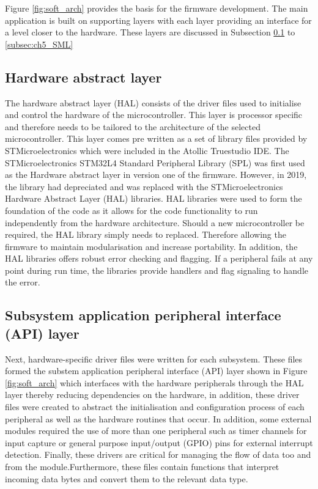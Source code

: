 Figure \ref{fig:soft_arch} provides the basis for the firmware development. The main application is built on supporting layers with each layer providing an interface for a level closer to the hardware. These layers are discussed in Subsection \ref{subsec:ch5_hal} to \ref{subsec:ch5_SML} 

\subsection{Hardware abstract layer}
\label{subsec:ch5_hal}
The hardware abstract layer (HAL) consists of the driver files used to initialise and control the hardware of the microcontroller. This layer is processor specific and therefore needs to be tailored to the architecture of the selected microcontroller. This layer comes pre written as a set of library files provided by STMicroelectronics which were included in the Atollic Truestudio IDE. The STMicroelectronics STM32L4 Standard Peripheral Library (SPL) was first used as the Hardware abstract layer  in version one of the firmware. However, in 2019, the library had depreciated and was replaced with the STMicroelectronics Hardware Abstract Layer (HAL) libraries. HAL libraries were used to form the foundation of the code as it allows for the code functionality to run independently from the hardware architecture. Should a new microcontroller be required, the HAL library simply needs to replaced. Therefore allowing the firmware to maintain modularisation and increase portability. In addition, the HAL libraries offers robust error checking and flagging. If a peripheral fails at any point during run time, the libraries provide handlers and flag signaling to handle the error.

\subsection{Subsystem application peripheral interface (API) layer}

Next, hardware-specific driver files were written for each subsystem. These files formed the substem application peripheral interface (API) layer shown in Figure \ref{fig:soft_arch} which interfaces with the hardware peripherals through the HAL layer thereby reducing dependencies on the hardware, in addition, these driver files were created to abstract the initialisation and configuration process of each peripheral as well as the hardware routines that occur. In addition, some external modules required the use of more than one peripheral such as timer channels for input capture or general purpose input/output (GPIO) pins for external interrupt detection. Finally, these drivers are critical for managing the flow of data too and from the module.Furthermore, these files contain functions that interpret incoming data bytes and convert them to the relevant data type.

